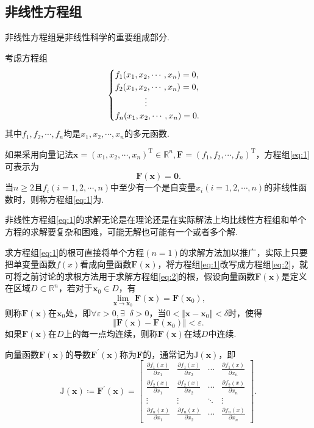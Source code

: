 \documentclass[cn,12pt,founder,a4paper]{elegantpaper}
\newcommand{\bbR}{\mathbb{R}}
\newcommand{\transpose}{\mathrm{T}}
\newcommand{\exist}{\exists\mathop{}\!}
\newcommand{\J}{\b{\mathrm{J}}}
\renewcommand{\emph}[1]{{\heiti{#1}}}
\renewcommand{\b}{\boldsymbol}
\begin{document}
\subsection{非线性方程组}
非线性方程组是非线性科学的重要组成部分.\par
考虑方程组
\begin{equation}\label{eq:1}
  \begin{cases}
    f_1(x_1,x_2,\cdots,x_n)=0,\\
    f_2(x_1,x_2,\cdots,x_n)=0,\\
    \hspace*{3.5em}\vdots\\
    f_n(x_1,x_2,\cdots,x_n)=0.
  \end{cases}
\end{equation}
其中\(f_1,f_2,\cdots,f_n\)均是\(x_1,x_2,\cdots,x_n\)的多元函数.\par 
如果采用向量记法\(\b{x}=(x_1,x_2,\cdots,x_n)^\transpose\in\bbR^n,\b{F}=(f_1,f_2,\cdots,f_n)^\transpose\)，方程组\eqref{eq:1}可表示为
\begin{equation}\label{eq:2}
  \b{F}(\b{x})=\b{0}.
\end{equation}
当\(n\geqslant 2\)且\(f_i(i=1,2,\cdots,n)\)中至少有一个是自变量\(x_i(i=1,2,\cdots,n)\)的非线性函数时，则称方程组\eqref{eq:1}为\emph{非线性方程组}.\par
非线性方程组\eqref{eq:1}的求解无论是在理论还是在实际解法上均比线性方程组和单个方程的求解要复杂和困难，可能无解也可能有一个或者多个解.\par
求方程组\eqref{eq:1}的根可直接将单个方程\((n=1)\)的求解方法加以推广，实际上只要把单变量函数\(f(x)\)看成向量函数\(\b{F}(\b{x})\)，将方程组\eqref{eq:1}改写成方程组\eqref{eq:2}，就可将之前讨论的求根方法用于求解方程组\eqref{eq:2}的根，假设向量函数\(\b{F}(\b{x})\)是定义在区域\(D\subset\bbR^n\)，若对于\(\b{x}_0\in D\)，有
\[\lim_{\b{x}\to\b{x}_0}\b{F}(\b{x})=\b{F}(\b{x}_0),\]
则称\(\b{F}(\b{x})\)在\(\b{x}_0\)处\emph{连续}，即\(\forall\varepsilon>0,\exist\delta>0\)，当\(0<\Vert\b{x}-\b{x}_0\Vert<\delta\)时，使得
\[\Vert\b{F}(\b{x})-\b{F}(\b{x}_0)\Vert<\varepsilon.\]
如果\(\b{F}(\b{x})\)在\(D\)上的每一点均连续，则称\(\b{F}(\b{x})\)在域\(D\)中连续.\par
向量函数\(\b{F}(\b{x})\)的导数\(\b{F}^\prime(\b{x})\)称为\(\b{F}\)的\emph{雅克比矩阵}，通常记为\(\J(\b{x})\)，即
\begin{equation}\label{eq:3}
  \J(\b{x})\coloneqq\b{F}^\prime(\b{x})=
  \begin{bmatrix}
    \frac{\partial f_1(x)}{\partial x_1}&\frac{\partial f_1(x)}{\partial x_2}&\cdots&\frac{\partial f_1(x)}{\partial x_n}\\[2pt]
    \frac{\partial f_2(x)}{\partial x_1}&\frac{\partial f_2(x)}{\partial x_2}&\cdots&\frac{\partial f_2(x)}{\partial x_n}\\[2pt]
    \vdots&\vdots&\ddots&\vdots\\[2pt]
    \frac{\partial f_n(x)}{\partial x_1}&\frac{\partial f_n(x)}{\partial x_2}&\cdots&\frac{\partial f_n(x)}{\partial x_n}
  \end{bmatrix}.
\end{equation}
\end{document}
